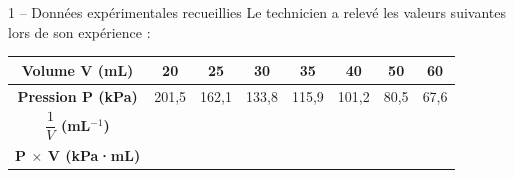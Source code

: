 \documentclass[11pt,a4paper]{article}
\begin{document}
\vspace{3mm}


\begin{documentbox}{1 -- Données expérimentales recueillies}
Le technicien a relevé les valeurs suivantes lors de son expérience :

\vspace{3mm}
\begin{center}
\begin{tabular}{|c|c|c|c|c|c|c|c|}
\hline
\textbf{Volume V (mL)} & 20 & 25 & 30 & 35 & 40 & 50 & 60 \\
\hline
\textbf{Pression P (kPa)} & 201,5 & 162,1 & 133,8 & 115,9 & 101,2 & 80,5 & 67,6 \\
\hline
\textbf{$\dfrac{1}{V}$ (mL$^{-1}$)} & \hspace{1cm} & \hspace{1cm} & \hspace{1cm} & \hspace{1cm} & \hspace{1cm} & \hspace{1cm} & \hspace{1cm} \\[6pt]
\hline
\textbf{P $\times$ V (kPa·mL)} & \hspace{1cm} & \hspace{1cm} & \hspace{1cm} & \hspace{1cm} & \hspace{1cm} & \hspace{1cm} & \hspace{1cm} \\[6pt]
\hline
\end{tabular}
\end{center}
\end{documentbox}

\vspace{3mm}
\end{document}
